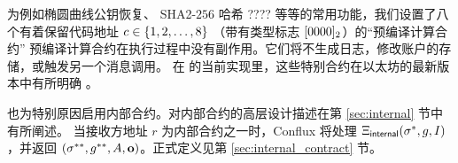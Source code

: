 为例如椭圆曲线公钥恢复、 SHA2-$256$ 哈希
????
等等的常用功能，我们设置了八个有着保留代码地址 $c\in{\left \{{1,2,\dots,8} \right \}}$ （带有类型标志 $[0000]_2$）的``预编译计算合约''
预编译计算合约在执行过程中没有副作用。它们将不生成日志，修改账户的存储，或触发另一个消息调用。
%
在 \name 的当前实现里，这些特别合约在以太坊的最新版本中有所明确 \cite{ETH_yellow}。

\name 也为特别原因启用内部合约。对内部合约的高层设计描述在第 \ref{sec:internal} 节中有所阐述。
当接收方地址 $r$ 为内部合约之一时，Conflux 将处理 $\mathrm{\Xi}_{\sf internal}(\mathbf{\sigma}^*,g,I)$，并返回 $\left(\mathbf{\sigma}^{**}, g^{**},  A, \mathbf{o} \right)$。正式定义见第 \ref{sec:internal_contract} 节。

